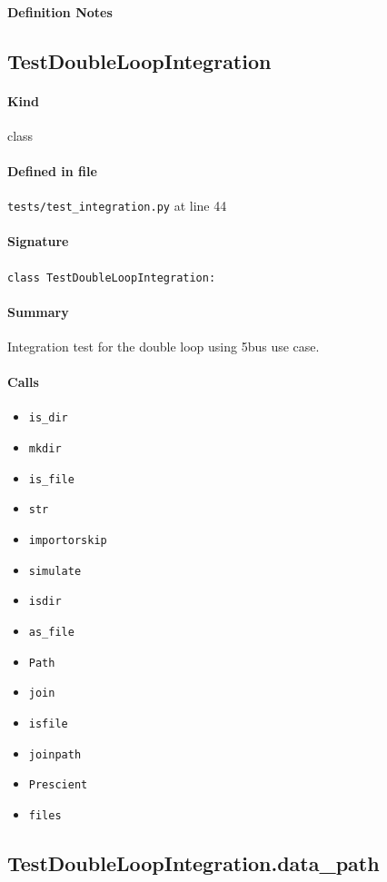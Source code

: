 \documentclass[11pt]{report}
\begin{document}
\paragraph{Definition Notes}
\subsection{TestDoubleLoopIntegration}
\label{def:tests-test_integration.py:TestDoubleLoopIntegration:L44}
\paragraph{Kind} class
\paragraph{Defined in file} \texttt{tests/test\_integration.py} at line 44
\paragraph{Signature} \texttt{class TestDoubleLoopIntegration:}
\paragraph{Summary} Integration test for the double loop using 5bus use case.
\paragraph{Calls}
\begin{itemize}[leftmargin=*]
  \item \texttt{is\_dir}
  \item \texttt{mkdir}
  \item \texttt{is\_file}
  \item \texttt{str}
  \item \texttt{importorskip}
  \item \texttt{simulate}
  \item \texttt{isdir}
  \item \texttt{as\_file}
  \item \texttt{Path}
  \item \texttt{join}
  \item \texttt{isfile}
  \item \texttt{joinpath}
  \item \texttt{Prescient}
  \item \texttt{files}
\end{itemize}
\subsection{TestDoubleLoopIntegration.data\_path}
\label{def:tests-test_integration.py:TestDoubleLoopIntegration.data_path:L48}
\end{document}
